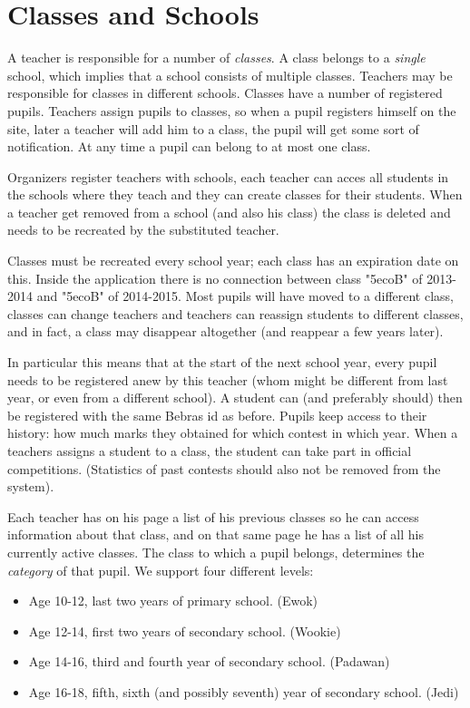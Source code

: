 
\section{Classes and Schools}

A teacher is responsible for a number of \emph{classes}. A class belongs to a \emph{single} school, which implies that a school consists of multiple classes. Teachers may be responsible for classes in different schools. Classes have a number of registered pupils. Teachers assign pupils to classes, so when a pupil registers himself on the site, later a teacher will add him to a class, the pupil will get some sort of notification. At any time a pupil can belong to at most one class. 

Organizers register teachers with schools, each teacher can acces all students in the schools where they teach and they can create classes for their students.
When a teacher get removed from a school (and also his class) the class is deleted and needs to be recreated by the substituted teacher.

Classes must be recreated every school year; each class has an expiration date on this. Inside the application there is no connection between class "5ecoB" of 2013-2014 and "5ecoB" of 2014-2015. Most pupils will have moved to a different class, classes can change teachers and teachers can reassign students to different classes, and in fact, a class may disappear altogether (and reappear a few years later).

In particular this means that at the start of the next school year, every pupil needs to be registered anew by this teacher (whom might be different from last year, or even from a different school). A student can (and preferably should) then be registered with the same Bebras id as before. Pupils keep access to their history: how much marks they obtained for which contest in which year. 
When a teachers assigns a student to a class, the student can take part in official competitions.
(Statistics of past contests should also not be removed from the system).

Each teacher has on his page a list of his previous classes so he can access information about that class, and on that same page he has a list of all his currently active classes. 
The class to which a pupil belongs, determines the \emph{category} of that pupil. We support four different levels: \label{levels}
\begin{itemize}
\item Age 10-12, last two years of primary school. (Ewok)
\item Age 12-14, first two years of secondary school. (Wookie)
\item Age 14-16, third and fourth year of secondary school. (Padawan)
\item Age 16-18, fifth, sixth (and possibly seventh) year of secondary school. (Jedi)
\end{itemize}

